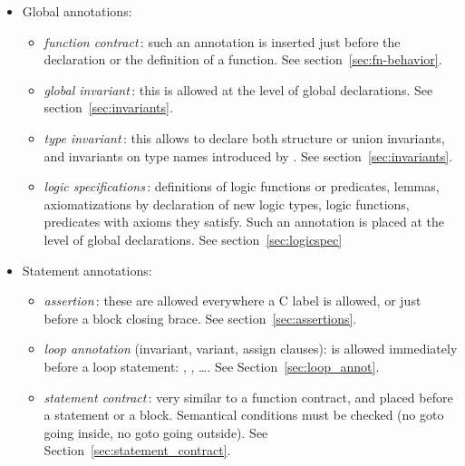 \begin{itemize}
\item Global annotations:
  \begin{itemize}
  \item \emph{function contract}\,: such an annotation is inserted just before
    the declaration or the definition of a function.
    See section~\ref{sec:fn-behavior}.

  \item \emph{global invariant}\,: this is allowed at the level of
    global declarations. See section~\ref{sec:invariants}.

  \item \emph{type invariant}\,: this allows to declare both structure
    or union invariants, and invariants on type names introduced by
    \typedef.  See section~\ref{sec:invariants}.

  \item \emph{logic specifications}\,: definitions of logic functions
    or predicates, lemmas, axiomatizations by declaration of new logic
    types, logic functions, predicates with axioms they satisfy. Such an
    annotation is placed at the level of global declarations. 
    See section~\ref{sec:logicspec}

  \end{itemize}

\item Statement annotations:
  \begin{itemize}
  \item \emph{assertion}\,: these are allowed
    everywhere a C label is allowed, or just before a
    block closing brace. See section~\ref{sec:assertions}.

  \item \emph{loop annotation} (invariant, variant, assign clauses): is
    allowed immediately before a loop statement: \For, \While,
    \Do\ldots \While. See Section~\ref{sec:loop_annot}.

  \item \emph{statement contract}\,: very similar to a function contract, and
    placed before a statement or a block.  Semantical conditions must
    be checked (no goto going inside, no goto
    going outside).  See Section~\ref{sec:statement_contract}.


\end{itemize}
\end{itemize}
